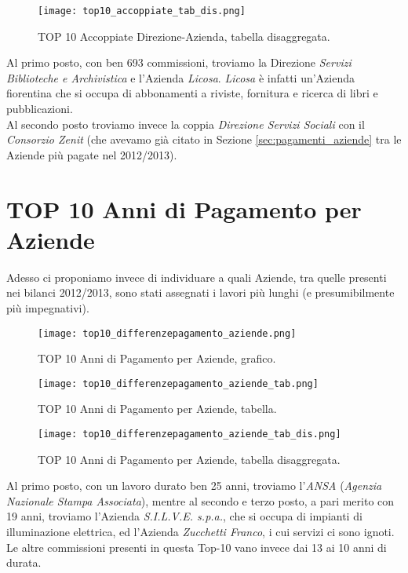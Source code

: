 		\begin{figure}[h!]
			\centering
				\texttt{[image: top10\_accoppiate\_tab\_dis.png]}
			\caption{TOP 10 Accoppiate Direzione-Azienda, tabella disaggregata.}
			\label{fig:top10_accoppiate_tab_dis}
		\end{figure}
		
		Al primo posto, con ben 693 commissioni, troviamo la Direzione \textit{Servizi Biblioteche e Archivistica} e l'Azienda \textit{Licosa}. \textit{Licosa} è infatti un'Azienda fiorentina che si occupa di abbonamenti a riviste, fornitura e ricerca di libri e pubblicazioni.\\
		Al secondo posto troviamo invece la coppia \textit{Direzione Servizi Sociali} con il \textit{Consorzio Zenit} (che avevamo già citato in Sezione \ref{sec:pagamenti_aziende} tra le Aziende più pagate nel 2012/2013).
		
		\FloatBarrier
	
	\section{TOP 10 Anni di Pagamento per Aziende} \label{sec:anni_pagamento_aziende}
		
		Adesso ci proponiamo invece di individuare a quali Aziende, tra quelle presenti nei bilanci 2012/2013, sono stati assegnati i lavori più lunghi (e presumibilmente più impegnativi).
		
		\begin{figure}[h!]
			\centering
				\texttt{[image: top10\_differenzepagamento\_aziende.png]}
			\caption{TOP 10 Anni di Pagamento per Aziende, grafico.}
			\label{fig:top10_differenzepagamento_aziende}
		\end{figure}
		
		\begin{figure}[h!]
			\centering
				\texttt{[image: top10\_differenzepagamento\_aziende\_tab.png]}
			\caption{TOP 10 Anni di Pagamento per Aziende, tabella.}
			\label{fig:top10_differenzepagamento_aziende_tab}
		\end{figure}
		
		\begin{figure}[h!]
			\centering
				\texttt{[image: top10\_differenzepagamento\_aziende\_tab\_dis.png]}
			\caption{TOP 10 Anni di Pagamento per Aziende, tabella disaggregata.}
			\label{fig:top10_differenzepagamento_aziende_tab_dis}
		\end{figure}
		
		Al primo posto, con un lavoro durato ben 25 anni, troviamo l'\textit{ANSA} (\textit{Agenzia Nazionale Stampa Associata}), mentre al secondo e terzo posto, a pari merito con 19 anni, troviamo l'Azienda \textit{S.I.L.V.E. s.p.a.}, che si occupa di impianti di illuminazione elettrica, ed l'Azienda \textit{Zucchetti Franco}, i cui servizi ci sono ignoti. Le altre commissioni presenti in questa Top-10 vano invece dai 13 ai 10 anni di durata.
		
